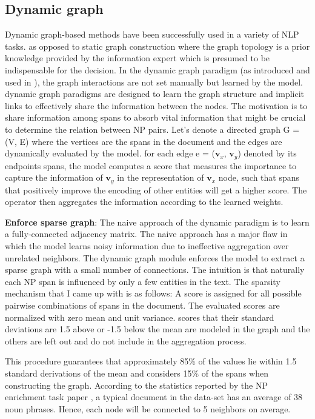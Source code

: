 \documentclass[11pt, a4paper, twocolumn]{article}
\begin{document}
\subsection{Dynamic graph}
\label{dynamicgraph}

Dynamic graph-based methods have been successfully used in a variety of NLP tasks. as opposed to static graph construction where the graph topology is a prior knowledge provided by the information expert which is presumed to be indispensable for the decision. In the dynamic graph paradigm (as introduced and used in \cite{dynamicgraph} \cite{dynamicgraphframeowrk}), the graph interactions are not set manually but learned by the model. dynamic graph paradigms are designed to learn the graph structure and implicit links to effectively share the information between the nodes.
The motivation is to share information among spans to absorb vital information that might be crucial to determine the relation between NP pairs.
Let's denote a directed graph G = (V, E) where the vertices are the spans in the document and the edges are dynamically evaluated by the model.
for each edge e = ($\mathbf{v}_x$, $\mathbf{v}_y$) denoted by its endpoints spans, the model computes a score that measures the importance to capture the information of $\mathbf{v}_y$ in the representation of $\mathbf{v}_x$ node,
such that spans that positively improve the encoding of other entities will get a higher score. The operator then aggregates the information according to the learned weights.

\textbf{Enforce sparse graph}: The naive approach of the dynamic paradigm is to learn a fully-connected adjacency matrix. The naive approach has a major flaw in which the model learns noisy information due to ineffective aggregation over unrelated neighbors. The dynamic graph module enforces the model to extract a sparse graph with a small number of connections. The intuition is that naturally each NP span is influenced by only a few entities in the text. The sparsity mechanism that I came up with is as follows:
A score is assigned for all possible pairwise combinations of spans in the document.
The evaluated scores are normalized with zero mean and unit variance. scores that their standard deviations are 1.5 above or -1.5 below the mean are modeled in the graph and the others are left out and do not include in the aggregation process.

This procedure guarantees that approximately 85\% of the values lie within 1.5 standard derivations of the mean and considers 15\% of the spans when constructing the graph. According to the statistics reported by the NP enrichment task paper \cite{tne}, a typical document in the data-set has an average of 38 noun phrases. Hence, each node will be connected to 5 neighbors on average.
\end{document}
